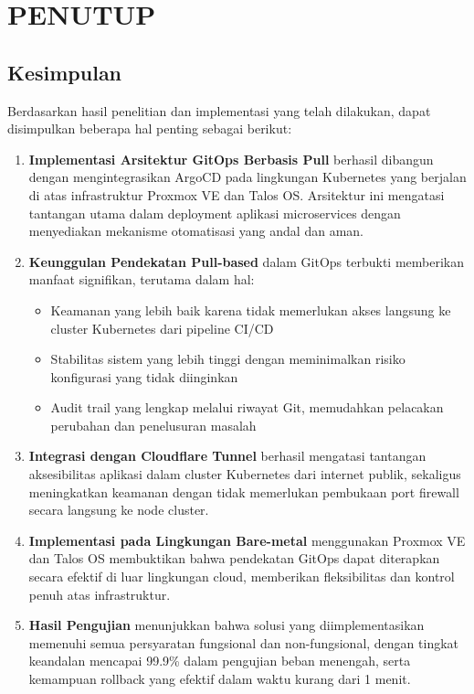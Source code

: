 \chapter{PENUTUP}
\section{Kesimpulan}

Berdasarkan hasil penelitian dan implementasi yang telah dilakukan, dapat disimpulkan beberapa hal penting sebagai berikut:

\begin{enumerate}
    \item \textbf{Implementasi Arsitektur GitOps Berbasis Pull} berhasil dibangun dengan mengintegrasikan ArgoCD pada lingkungan Kubernetes yang berjalan di atas infrastruktur Proxmox VE dan Talos OS. Arsitektur ini mengatasi tantangan utama dalam deployment aplikasi microservices dengan menyediakan mekanisme otomatisasi yang andal dan aman.

    \item \textbf{Keunggulan Pendekatan Pull-based} dalam GitOps terbukti memberikan manfaat signifikan, terutama dalam hal:
          \begin{itemize}
              \item Keamanan yang lebih baik karena tidak memerlukan akses langsung ke cluster Kubernetes dari pipeline CI/CD
              \item Stabilitas sistem yang lebih tinggi dengan meminimalkan risiko konfigurasi yang tidak diinginkan
              \item Audit trail yang lengkap melalui riwayat Git, memudahkan pelacakan perubahan dan penelusuran masalah
          \end{itemize}

    \item \textbf{Integrasi dengan Cloudflare Tunnel} berhasil mengatasi tantangan aksesibilitas aplikasi dalam cluster Kubernetes dari internet publik, sekaligus meningkatkan keamanan dengan tidak memerlukan pembukaan port firewall secara langsung ke node cluster.

    \item \textbf{Implementasi pada Lingkungan Bare-metal} menggunakan Proxmox VE dan Talos OS membuktikan bahwa pendekatan GitOps dapat diterapkan secara efektif di luar lingkungan cloud, memberikan fleksibilitas dan kontrol penuh atas infrastruktur.

    \item \textbf{Hasil Pengujian} menunjukkan bahwa solusi yang diimplementasikan memenuhi semua persyaratan fungsional dan non-fungsional, dengan tingkat keandalan mencapai 99.9\% dalam pengujian beban menengah, serta kemampuan rollback yang efektif dalam waktu kurang dari 1 menit.
\end{enumerate}

